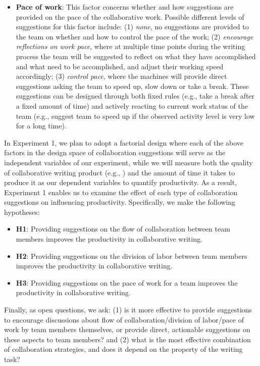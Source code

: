 \begin{itemize}
\item {\bf Pace of work}: This factor concerns whether and how suggestions are provided on the pace of the collaborative work. Possible different levels of suggestions for this factor include: (1) {\em none}, no suggestions are provided to the team on whether and how to control the pace of the work; (2) {\em encourage reflections on work pace}, where at multiple time points during the writing process the team will be suggested to reflect on what they have accomplished and what need to be accomplished, and adjust their working speed accordingly; (3) {\em control pace}, where the machines will provide direct suggestions asking the team to speed up, slow down or take a break. These suggestions can be designed through both fixed rules (e.g., take a break after a fixed amount of time) and actively reacting to current work status of the team (e.g., suggest team to speed up if the observed activity level is very low for a long time). 
\end{itemize}

In Experiment 1, we plan to adopt a factorial design where each of the above factors in the design space of collaboration suggestions will serve as the independent variables of our experiment, while we will measure both the quality of collaborative writing product (e.g., ) and the amount of time it takes to produce it as our dependent variables to quantify productivity. As a result, Experiment 1 enables us to examine the effect of each type of collaboration suggestions on influencing productivity. Specifically, we make the following hypotheses:
\begin{itemize}
\item{\bf H1}: Providing suggestions on the flow of collaboration between team members improves the productivity in collaborative writing.
\item{\bf H2}: Providing suggestions on the division of labor between team members improves the productivity in collaborative writing.
\item{\bf H3}: Providing suggestions on the pace of work for a team improves the productivity in collaborative writing.
\end{itemize}
Finally, as open questions, we ask: (1) is it more effective to provide suggestions to encourage discussions about flow of collaboration/division of labor/pace of work by team members themselves, or provide direct, actionable suggestions on these aspects to team members? and (2) what is the most effective combination of collaboration strategies, and does it depend on the property of the writing task?

